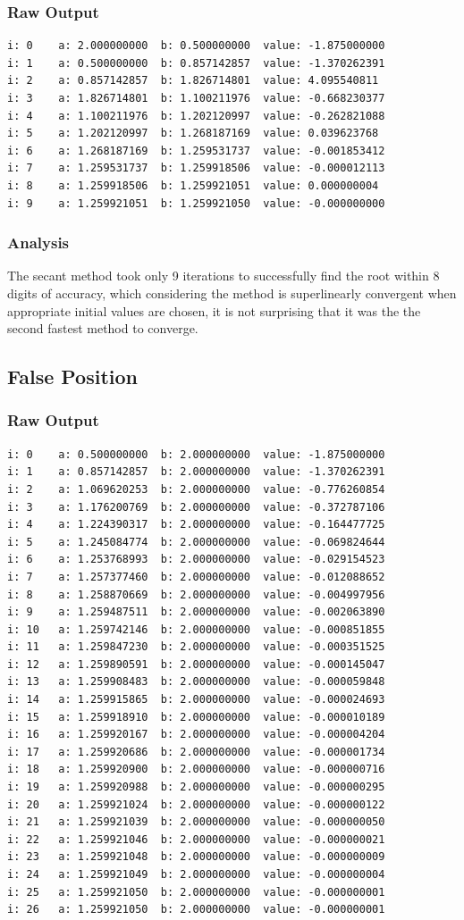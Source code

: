 \documentclass[11pt]{article} %
\begin{document}
\subsubsection*{Raw Output}
\begin{verbatim}
i: 0	a: 2.000000000	b: 0.500000000	value: -1.875000000
i: 1	a: 0.500000000	b: 0.857142857	value: -1.370262391
i: 2	a: 0.857142857	b: 1.826714801	value: 4.095540811
i: 3	a: 1.826714801	b: 1.100211976	value: -0.668230377
i: 4	a: 1.100211976	b: 1.202120997	value: -0.262821088
i: 5	a: 1.202120997	b: 1.268187169	value: 0.039623768
i: 6	a: 1.268187169	b: 1.259531737	value: -0.001853412
i: 7	a: 1.259531737	b: 1.259918506	value: -0.000012113
i: 8	a: 1.259918506	b: 1.259921051	value: 0.000000004
i: 9	a: 1.259921051	b: 1.259921050	value: -0.000000000
\end{verbatim}

\subsubsection*{Analysis}
The secant method took only 9 iterations to successfully find the root within 8 digits of accuracy,
which considering the method is superlinearly convergent when appropriate initial values are 
chosen, it is not surprising that it was the the second fastest method to converge.
\subsection*{False Position}
\subsubsection*{Raw Output}
\begin{verbatim}
i: 0	a: 0.500000000	b: 2.000000000	value: -1.875000000
i: 1	a: 0.857142857	b: 2.000000000	value: -1.370262391
i: 2	a: 1.069620253	b: 2.000000000	value: -0.776260854
i: 3	a: 1.176200769	b: 2.000000000	value: -0.372787106
i: 4	a: 1.224390317	b: 2.000000000	value: -0.164477725
i: 5	a: 1.245084774	b: 2.000000000	value: -0.069824644
i: 6	a: 1.253768993	b: 2.000000000	value: -0.029154523
i: 7	a: 1.257377460	b: 2.000000000	value: -0.012088652
i: 8	a: 1.258870669	b: 2.000000000	value: -0.004997956
i: 9	a: 1.259487511	b: 2.000000000	value: -0.002063890
i: 10	a: 1.259742146	b: 2.000000000	value: -0.000851855
i: 11	a: 1.259847230	b: 2.000000000	value: -0.000351525
i: 12	a: 1.259890591	b: 2.000000000	value: -0.000145047
i: 13	a: 1.259908483	b: 2.000000000	value: -0.000059848
i: 14	a: 1.259915865	b: 2.000000000	value: -0.000024693
i: 15	a: 1.259918910	b: 2.000000000	value: -0.000010189
i: 16	a: 1.259920167	b: 2.000000000	value: -0.000004204
i: 17	a: 1.259920686	b: 2.000000000	value: -0.000001734
i: 18	a: 1.259920900	b: 2.000000000	value: -0.000000716
i: 19	a: 1.259920988	b: 2.000000000	value: -0.000000295
i: 20	a: 1.259921024	b: 2.000000000	value: -0.000000122
i: 21	a: 1.259921039	b: 2.000000000	value: -0.000000050
i: 22	a: 1.259921046	b: 2.000000000	value: -0.000000021
i: 23	a: 1.259921048	b: 2.000000000	value: -0.000000009
i: 24	a: 1.259921049	b: 2.000000000	value: -0.000000004
i: 25	a: 1.259921050	b: 2.000000000	value: -0.000000001
i: 26	a: 1.259921050	b: 2.000000000	value: -0.000000001
\end{verbatim}
\end{document}
